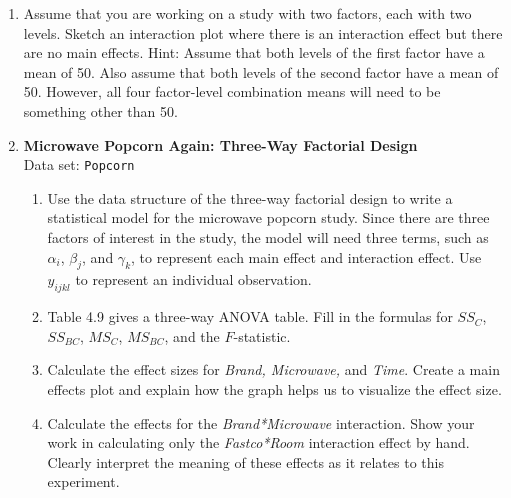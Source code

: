 \documentclass[
]{book}
\begin{document}
\begin{enumerate}
  \item Assume that you are working on a study with two factors, each with two levels. Sketch an interaction plot where there is an interaction effect but there are no main effects. Hint: Assume that both levels of the first factor have a mean of 50. Also assume that both levels of the second factor have a mean of 50. However, all four factor-level combination means will need to be something other than 50.

  \item \textbf{Microwave Popcorn Again: Three-Way Factorial Design}\\
  Data set: \texttt{Popcorn}
  \begin{enumerate}
    \item Use the data structure of the three-way factorial design to write a statistical model for the microwave popcorn study. Since there are three factors of interest in the study, the model will need three terms, such as $\alpha_i$, $\beta_j$, and $\gamma_k$, to represent each main effect and interaction effect. Use $y_{ijkl}$ to represent an individual observation.
    \item Table 4.9 gives a three-way ANOVA table. Fill in the formulas for $SS_C$, $SS_{BC}$, $MS_C$, $MS_{BC}$, and the $F$-statistic.
    \item Calculate the effect sizes for \textit{Brand, Microwave,} and \textit{Time}. Create a main effects plot and explain how the graph helps us to visualize the effect size.
    \item Calculate the effects for the \textit{Brand*Microwave} interaction. Show your work in calculating only the \textit{Fastco*Room} interaction effect by hand. Clearly interpret the meaning of these effects as it relates to this experiment.
  \end{enumerate}


\end{enumerate}
\end{document}
